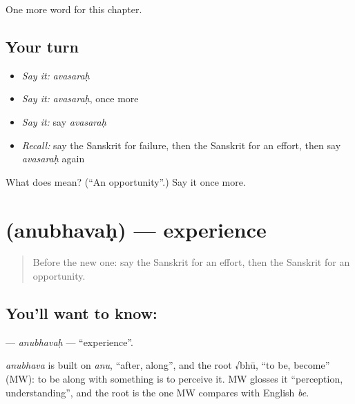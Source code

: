 \begin{grammarlens}[title={What you've built}]
One more word for this chapter.
\end{grammarlens}

\subsection*{Your turn}
\begin{itemize}
\raggedright
  \item \emph{Say it:} \emph{avasaraḥ}
  \item \emph{Say it:} \emph{avasaraḥ}, once more
  \item \emph{Say it:} say \emph{avasaraḥ}
  \item \emph{Recall:} say the Sanskrit for failure, then the Sanskrit for an effort, then say \emph{avasaraḥ} again
\end{itemize}

\begin{tcolorbox}[breakable,colback=teal!4,colframe=teal!35!black,title={Before you move on}]
What does  mean? (\textquotedblleft{}An opportunity\textquotedblright{}.) Say it once more.
\end{tcolorbox}
\section[\texorpdfstring{\sk{अनुभवः} (anubhavaḥ)}{अनुभवः (anubhavaḥ)}]{ (anubhavaḥ) — experience}

\label{lesson:SA-C230-anubhavah}



\begin{quote}
Before the new one: say the Sanskrit for an effort, then the Sanskrit for an opportunity.
\end{quote}

\subsection*{You'll want to know: }
\textbf{} — \emph{anubhavaḥ} — \textquotedblleft{}experience\textquotedblright{}.

\begin{cousinweb}
\emph{anubhava} is built on \emph{anu}, \textquotedblleft{}after, along\textquotedblright{}, and the root √bhū, \textquotedblleft{}to be, become\textquotedblright{} (MW): to be along with something is to perceive it. MW glosses it \textquotedblleft{}perception, understanding\textquotedblright{}, and the root is the one MW compares with English \emph{be}.
\end{cousinweb}

